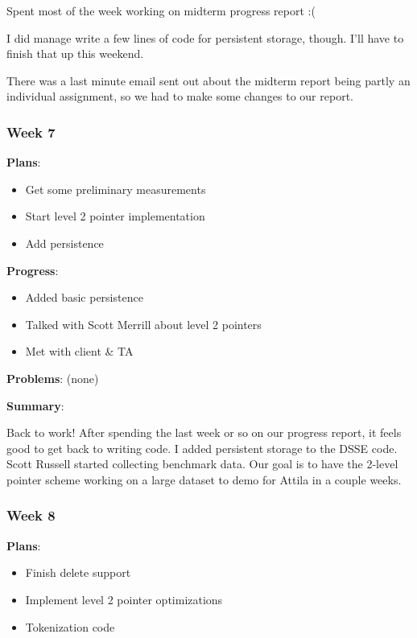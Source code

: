 Spent most of the week working on midterm progress report :( 

I did manage write a few lines of code for persistent storage, though. I'll have to finish that up this weekend. 

 There was a last minute email sent out about the midterm report being partly an individual assignment, so we had to make some changes to our report.  


\subsubsection{Week 7}

\noindent \textbf{Plans}:
\begin{itemize}
\item Get some preliminary measurements 
\item Start level 2 pointer implementation 
\item Add persistence 
\end{itemize}

\noindent \textbf{Progress}:
\begin{itemize}
\item Added basic persistence 
\item Talked with Scott Merrill about level 2 pointers 
\item Met with client \& TA 
\end{itemize}

\noindent \textbf{Problems}:
(none)

\noindent \textbf{Summary}: 

Back to work! After spending the last week or so on our progress report, it feels good to get back to writing code. I added persistent storage to the DSSE code. Scott Russell started collecting benchmark data. Our goal is to have the 2-level pointer scheme working on a large dataset to demo for Attila in a couple weeks. 


\subsubsection{Week 8}

\noindent \textbf{Plans}:
\begin{itemize}
\item Finish delete support 
\item Implement level 2 pointer optimizations 
\item Tokenization code 
\end{itemize}
 


